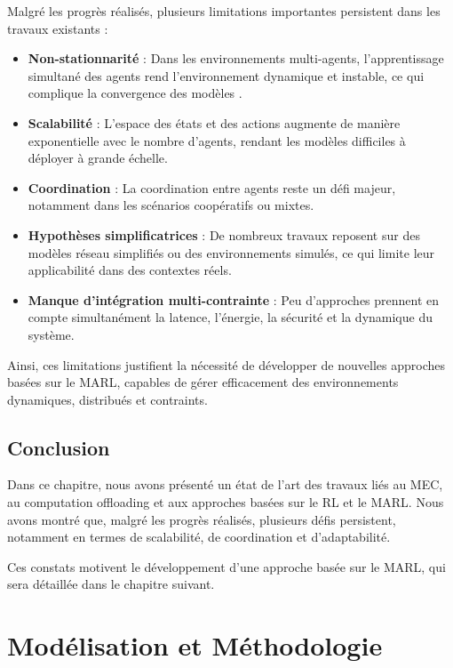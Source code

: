 \documentclass[12pt,a4paper]{report}
\begin{document}
Malgré les progrès réalisés, plusieurs limitations importantes persistent dans les travaux existants :

\begin{itemize}
    \item \textbf{Non-stationnarité} : Dans les environnements multi-agents, l’apprentissage simultané des agents rend l’environnement dynamique et instable, ce qui complique la convergence des modèles \cite{zhang2021marl}.  

    \item \textbf{Scalabilité} : L’espace des états et des actions augmente de manière exponentielle avec le nombre d’agents, rendant les modèles difficiles à déployer à grande échelle.  

    \item \textbf{Coordination} : La coordination entre agents reste un défi majeur, notamment dans les scénarios coopératifs ou mixtes.  

    \item \textbf{Hypothèses simplificatrices} : De nombreux travaux reposent sur des modèles réseau simplifiés ou des environnements simulés, ce qui limite leur applicabilité dans des contextes réels.  

    \item \textbf{Manque d’intégration multi-contrainte} : Peu d’approches prennent en compte simultanément la latence, l’énergie, la sécurité et la dynamique du système.  

\end{itemize}

Ainsi, ces limitations justifient la nécessité de développer de nouvelles approches basées sur le MARL, capables de gérer efficacement des environnements dynamiques, distribués et contraints.
\section{Conclusion}

Dans ce chapitre, nous avons présenté un état de l’art des travaux liés au MEC, au computation offloading et aux approches basées sur le RL et le MARL. Nous avons montré que, malgré les progrès réalisés, plusieurs défis persistent, notamment en termes de scalabilité, de coordination et d’adaptabilité.

Ces constats motivent le développement d’une approche basée sur le MARL, qui sera détaillée dans le chapitre suivant.

\chapter{Modélisation et Méthodologie}
\end{document}
